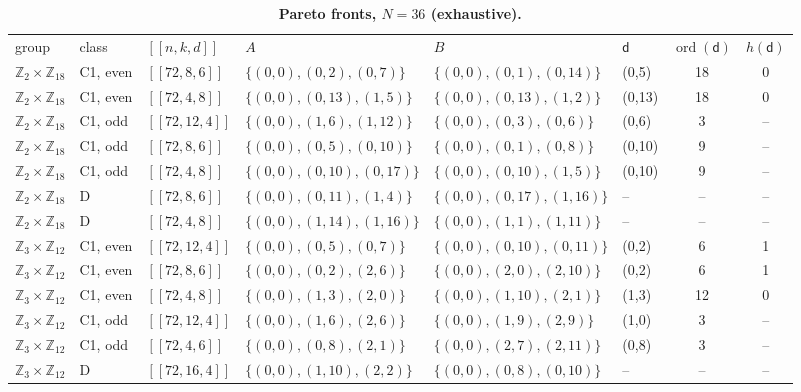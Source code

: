 \documentclass[reprint,twocolumn,superscriptaddress,nofootinbib]{revtex4-2}
\theoremstyle{plain}
\newcommand{\col}{\mathsf{d}}          %
\begin{document}
\begin{table}[!t]
\caption{\textbf{Pareto fronts, $N=36$ (exhaustive).}}
\label{tab:codes-b}
\footnotesize
\begin{ruledtabular}
\begin{tabular}{llllllcc}
group & class & $[[n,k,d]]$ & $A$ & $B$ & $\col$ & $\operatorname{ord}(\col)$ & $h(\col)$ \\
\colrule
$\mathbb{Z}_{2}\times\mathbb{Z}_{18}$ & C1, even & $[[72,8,6]]$ & $\{(0,0),(0,2),(0,7)\}$ & $\{(0,0),(0,1),(0,14)\}$ & (0,5) & 18 & 0 \\
$\mathbb{Z}_{2}\times\mathbb{Z}_{18}$ & C1, even & $[[72,4,8]]$ & $\{(0,0),(0,13),(1,5)\}$ & $\{(0,0),(0,13),(1,2)\}$ & (0,13) & 18 & 0 \\
$\mathbb{Z}_{2}\times\mathbb{Z}_{18}$ & C1, odd & $[[72,12,4]]$ & $\{(0,0),(1,6),(1,12)\}$ & $\{(0,0),(0,3),(0,6)\}$ & (0,6) & 3 & -- \\
$\mathbb{Z}_{2}\times\mathbb{Z}_{18}$ & C1, odd & $[[72,8,6]]$ & $\{(0,0),(0,5),(0,10)\}$ & $\{(0,0),(0,1),(0,8)\}$ & (0,10) & 9 & -- \\
$\mathbb{Z}_{2}\times\mathbb{Z}_{18}$ & C1, odd & $[[72,4,8]]$ & $\{(0,0),(0,10),(0,17)\}$ & $\{(0,0),(0,10),(1,5)\}$ & (0,10) & 9 & -- \\
$\mathbb{Z}_{2}\times\mathbb{Z}_{18}$ & D & $[[72,8,6]]$ & $\{(0,0),(0,11),(1,4)\}$ & $\{(0,0),(0,17),(1,16)\}$ & -- & -- & -- \\
$\mathbb{Z}_{2}\times\mathbb{Z}_{18}$ & D & $[[72,4,8]]$ & $\{(0,0),(1,14),(1,16)\}$ & $\{(0,0),(1,1),(1,11)\}$ & -- & -- & -- \\
$\mathbb{Z}_{3}\times\mathbb{Z}_{12}$ & C1, even & $[[72,12,4]]$ & $\{(0,0),(0,5),(0,7)\}$ & $\{(0,0),(0,10),(0,11)\}$ & (0,2) & 6 & 1 \\
$\mathbb{Z}_{3}\times\mathbb{Z}_{12}$ & C1, even & $[[72,8,6]]$ & $\{(0,0),(0,2),(2,6)\}$ & $\{(0,0),(2,0),(2,10)\}$ & (0,2) & 6 & 1 \\
$\mathbb{Z}_{3}\times\mathbb{Z}_{12}$ & C1, even & $[[72,4,8]]$ & $\{(0,0),(1,3),(2,0)\}$ & $\{(0,0),(1,10),(2,1)\}$ & (1,3) & 12 & 0 \\
$\mathbb{Z}_{3}\times\mathbb{Z}_{12}$ & C1, odd & $[[72,12,4]]$ & $\{(0,0),(1,6),(2,6)\}$ & $\{(0,0),(1,9),(2,9)\}$ & (1,0) & 3 & -- \\
$\mathbb{Z}_{3}\times\mathbb{Z}_{12}$ & C1, odd & $[[72,4,6]]$ & $\{(0,0),(0,8),(2,1)\}$ & $\{(0,0),(2,7),(2,11)\}$ & (0,8) & 3 & -- \\
$\mathbb{Z}_{3}\times\mathbb{Z}_{12}$ & D & $[[72,16,4]]$ & $\{(0,0),(1,10),(2,2)\}$ & $\{(0,0),(0,8),(0,10)\}$ & -- & -- & -- \\

\end{tabular}
\end{ruledtabular}
\end{table}
\end{document}
